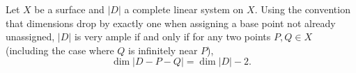 Let $X$ be a surface and $|D|$ a complete linear system on $X$. Using the convention that dimensions drop by exactly one when assigning a base point not already unassigned, $|D|$ is very ample if and only if for any two points $P, Q \in X$ (including the case where $Q$ is infinitely near $P$),
$$\dim |D - P - Q| = \dim |D| - 2.$$
